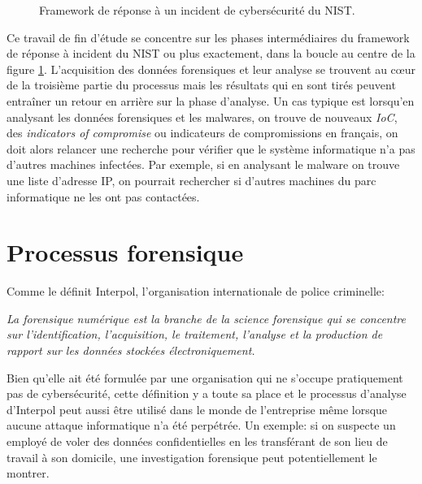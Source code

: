 \begin{figure}
    \centering
    \noindent
    \makebox[\textwidth]{}
    \caption{Framework de réponse à un incident de cybersécurité du NIST.}
    \label{fig:ir-diagram}
\end{figure}

Ce travail de fin d'étude se concentre sur les phases intermédiaires du framework de réponse à incident du NIST ou plus exactement, dans la boucle au centre de la figure \ref{fig:ir-diagram}. L'acquisition des données forensiques et leur analyse se trouvent au cœur de la troisième partie du processus mais les résultats qui en sont tirés peuvent entraîner un retour en arrière sur la phase d'analyse. Un cas typique est lorsqu'en analysant les données forensiques et les malwares, on trouve de nouveaux \textit{IoC}, des \textit{indicators of compromise} ou indicateurs de compromissions en français, on doit alors relancer une recherche pour vérifier que le système informatique n'a pas d'autres machines infectées. Par exemple, si en analysant le malware on trouve une liste d'adresse IP, on pourrait rechercher si d'autres machines du parc informatique ne les ont pas contactées.





\section{Processus forensique}

Comme le définit Interpol, l'organisation internationale de police criminelle: \cite{3}

\begin{customquote}
    \itshape La forensique numérique est la branche de la science forensique qui se concentre sur l'identification, l'acquisition, le traitement, l'analyse et la production de rapport sur les données stockées électroniquement.
\end{customquote}

Bien qu'elle ait été formulée par une organisation qui ne s'occupe pratiquement pas de cybersécurité, cette définition y a toute sa place et le processus d'analyse d'Interpol \cite{4} peut aussi être utilisé dans le monde de l'entreprise même lorsque aucune attaque informatique n'a été perpétrée. Un exemple: si on suspecte un employé de voler des données confidentielles en les transférant de son lieu de travail à son domicile, une investigation forensique peut potentiellement le montrer.

